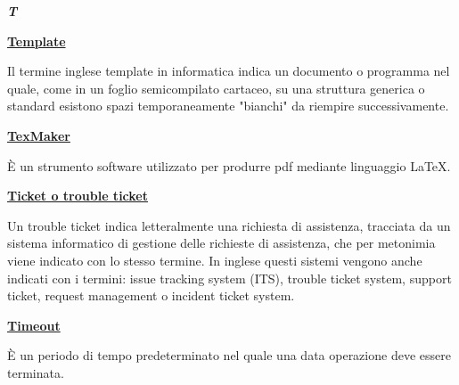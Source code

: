 \newpage
	
\cleardoublepage
{}
{}
\noindent\hrulefill\hspace{4mm}\textbf{\textsl{\Huge{T}}}\hspace{4mm}\hrulefill

\vspace*{2\bigskipamount}	

\begin{addmargin}[0em]{0em}		
	\textbf{\underline{Template}}
	\end{addmargin}
	 
\medskip
\begin{addmargin}[5em]{1em}	
Il termine inglese template in informatica indica un documento o programma nel quale, come in un foglio semicompilato cartaceo, su una struttura generica o standard esistono spazi temporaneamente "bianchi" da riempire successivamente.
\end{addmargin}

\bigskip
\begin{addmargin}[0em]{0em}		
	\textbf{\underline{TexMaker}}
\end{addmargin} 
	
\medskip
\begin{addmargin}[5em]{1em}	
È un strumento software utilizzato per produrre pdf mediante linguaggio \LaTeX{}.
\end{addmargin}

\bigskip
\begin{addmargin}[0em]{0em}		
	\textbf{\underline{Ticket o trouble ticket}}
\end{addmargin}
	
\medskip
\begin{addmargin}[5em]{1em}	 
Un trouble ticket indica letteralmente una richiesta di assistenza, tracciata da un sistema informatico di gestione delle richieste di assistenza, che per metonimia viene indicato con lo stesso termine.
In inglese questi sistemi vengono anche indicati con i termini: issue tracking system (ITS), trouble ticket system, support ticket, request management o incident ticket system.
\end{addmargin}

\bigskip
\begin{addmargin}[0em]{0em}	
	\textbf{\underline{Timeout}}
\end{addmargin}

\medskip
\begin{addmargin}[5em]{1em}
È un periodo di tempo predeterminato nel quale una data operazione deve essere terminata.
\end{addmargin}

